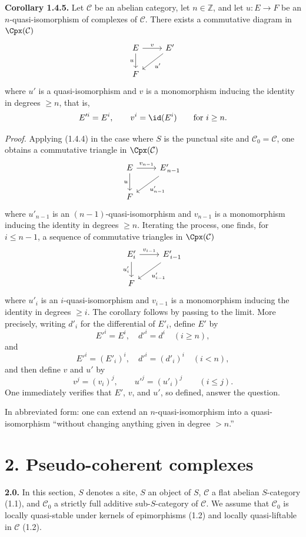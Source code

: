 \documentclass[11pt]{article}
\begin{document}
\textbf{Corollary 1.4.5.} Let \(\mathcal C\) be an abelian category, let \(n\in\mathbb Z\), and let \(u:E\to F\) be an \(n\)-quasi-isomorphism of complexes of \(\mathcal C\). There exists a commutative diagram in \(\Cpx(\mathcal C)\)
\[
\begin{tikzcd}
E \arrow[r,"v"] \arrow[d,"u"'] & E' \arrow[dl,"u'"]\\
F &
\end{tikzcd}
\]
where \(u'\) is a quasi-isomorphism and \(v\) is a monomorphism inducing the identity in degrees \(\geq n\), that is,
\[
  E'^i=E^i,\qquad v^i=\id(E^i)\qquad\text{for }i\geq n.
\]

\emph{Proof.} Applying (1.4.4) in the case where \(S\) is the punctual site and \(\mathcal C_0=\mathcal C\), one obtains a commutative triangle in \(\Cpx(\mathcal C)\)
\[
\begin{tikzcd}
E \arrow[r,"v_{n-1}"] \arrow[d,"u"'] & E'_{\,n-1} \arrow[dl,"u'_{n-1}"]\\
F &
\end{tikzcd}
\]
where \(u'_{n-1}\) is an \((n-1)\)-quasi-isomorphism and \(v_{n-1}\) is a monomorphism inducing the identity in degrees \(\geq n\). Iterating the process, one finds, for \(i\leq n-1\), a sequence of commutative triangles in \(\Cpx(\mathcal C)\)
\[
\begin{tikzcd}
E'_i \arrow[r,"v_{i-1}"] \arrow[d,"u'_i"'] & E'_{\,i-1} \arrow[dl,"u'_{i-1}"]\\
F &
\end{tikzcd}
\]
where \(u'_i\) is an \(i\)-quasi-isomorphism and \(v_{i-1}\) is a monomorphism inducing the identity in degrees \(\geq i\). The corollary follows by passing to the limit. More precisely, writing \(d'_i\) for the differential of \(E'_i\), define \(E'\) by
\[
  E'^i=E^i,\quad d'^i=d^i\quad (i\geq n),
\]
and
\[
  E'^i=(E'_i)^i,\quad d'^i=(d'_i)^i\quad (i<n),
\]
and then define \(v\) and \(u'\) by
\[
  v^j=(v_i)^j,\qquad u'^j=(u'_i)^j\qquad (i\leq j).
\]
One immediately verifies that \(E'\), \(v\), and \(u'\), so defined, answer the question.

In abbreviated form: one can extend an \(n\)-quasi-isomorphism into a quasi-isomorphism ``without changing anything given in degree \(>n\).''

\section*{2. Pseudo-coherent complexes}

\textbf{2.0.} In this section, \(S\) denotes a site, \(S\) an object of \(S\), \(\mathcal C\) a flat abelian \(S\)-category (1.1), and \(\mathcal C_0\) a strictly full additive sub-\(S\)-category of \(\mathcal C\). We assume that \(\mathcal C_0\) is locally quasi-stable under kernels of epimorphisms (1.2) and locally quasi-liftable in \(\mathcal C\) (1.2).
\end{document}
